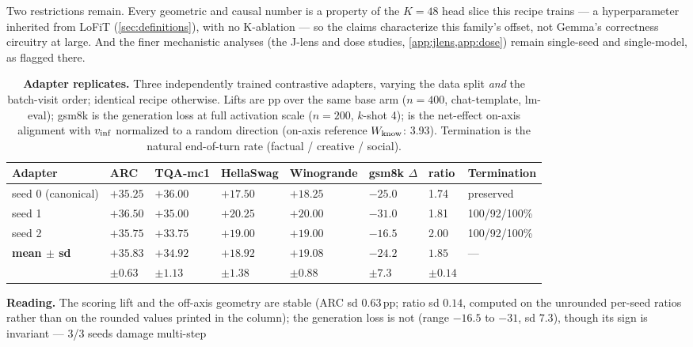 Two restrictions remain. Every geometric and causal number is a property of the
$K = 48$ head slice this recipe trains --- a hyperparameter inherited from LoFiT
(\cref{sec:definitions}), with no K-ablation --- so the claims characterize this
family's offset, not Gemma's correctness circuitry at large. And the finer mechanistic
analyses (the J-lens and dose studies, \cref{app:jlens,app:dose}) remain single-seed
and single-model, as flagged there.

\begin{table}[tbp]
\centering
\begin{threeparttable}
\caption{\textbf{Adapter replicates.} Three independently trained contrastive
adapters, varying the data split \emph{and} the batch-visit order; identical recipe
otherwise. Lifts are pp over the same base arm ($n{=}400$, chat-template, lm-eval);
gsm8k is the generation loss at full activation scale ($n{=}200$, $k$-shot 4);
 is the net-effect on-axis alignment with $\vinf$ normalized to a random
direction (on-axis reference $\Wknow$: 3.93). Termination is the natural end-of-turn
rate (factual / creative / social).}
\label{tab:seeds}
\footnotesize
\begin{tabular}{L{2.1cm} R{1.5cm} R{1.5cm} R{1.6cm} R{1.5cm} R{1.6cm} R{1.3cm} L{2.2cm}}
\toprule
Adapter & ARC & TQA-mc1 & HellaSwag & Winogrande & gsm8k $\Delta$ & ratio &
Termination \\
\midrule
seed 0 (canonical) & $+35.25$ & $+36.00$ & $+17.50$ & $+18.25$ & $-25.0$ & 1.74 &
preserved \\
seed 1 & $+36.50$ & $+35.00$ & $+20.25$ & $+20.00$ & $-31.0$ & 1.81 & 100/92/100\% \\
seed 2 & $+35.75$ & $+33.75$ & $+19.00$ & $+19.00$ & $-16.5$ & 2.00 & 100/92/100\% \\
\midrule
\textbf{mean $\pm$ sd} & $\mathbf{+35.83}$ & $+34.92$ & $+18.92$ & $+19.08$ &
$\mathbf{-24.2}$ & $\mathbf{1.85}$ & --- \\
 & $\pm 0.63$ & $\pm 1.13$ & $\pm 1.38$ & $\pm 0.88$ & $\pm 7.3$ & $\pm 0.14$ & \\
\bottomrule
\end{tabular}
\begin{tablenotes}[flushleft]\footnotesize
\item \textbf{Reading.} The scoring lift and the off-axis geometry are stable
(ARC sd $0.63$\,pp; ratio sd $0.14$, computed on the unrounded per-seed ratios rather
than on the rounded values printed in the column); the generation loss is not (range $-16.5$ to
$-31$, sd $7.3$), though its sign is invariant --- 3/3 seeds damage multi-step

\end{tablenotes}
\end{threeparttable}
\end{table}
